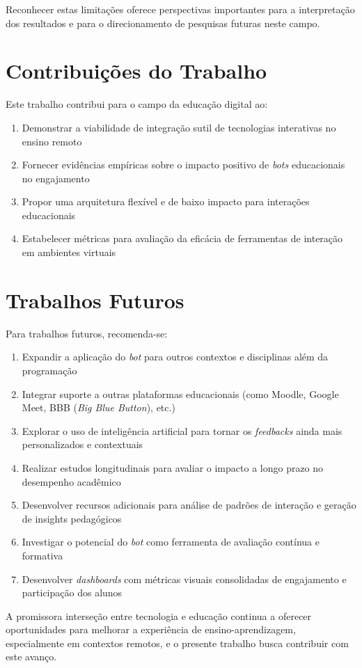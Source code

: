 Reconhecer estas limitações oferece perspectivas importantes para a
interpretação dos resultados e para o direcionamento de pesquisas futuras neste
campo.

\section{Contribuições do Trabalho}
\label{sec:contribuicoes}

Este trabalho contribui para o campo da educação digital ao:

\begin{enumerate}
\item Demonstrar a viabilidade de integração sutil de tecnologias interativas no
ensino remoto
\item Fornecer evidências empíricas sobre o impacto positivo de \textit{bots} 
educacionais no engajamento
\item Propor uma arquitetura flexível e de baixo impacto para interações
educacionais
\item Estabelecer métricas para avaliação da eficácia de ferramentas de
interação em ambientes virtuais
\end{enumerate}

\section{Trabalhos Futuros}
\label{sec:trabalhos-futuros}

Para trabalhos futuros, recomenda-se:

\begin{enumerate}
\item Expandir a aplicação do \textit{bot} para outros contextos e disciplinas
além da programação
\item Integrar suporte a outras plataformas educacionais (como Moodle, Google
Meet, BBB (\textit{Big Blue Button}), etc.)
\item Explorar o uso de inteligência artificial para tornar os
\textit{feedbacks} ainda mais personalizados e contextuais
\item Realizar estudos longitudinais para avaliar o impacto a longo prazo no
desempenho acadêmico
\item Desenvolver recursos adicionais para análise de padrões de interação e
geração de insights pedagógicos
\item Investigar o potencial do \textit{bot} como ferramenta de avaliação
contínua e formativa
\item Desenvolver \textit{dashboards} com métricas visuais consolidadas de
engajamento e participação dos alunos
\end{enumerate}

A promissora interseção entre tecnologia e educação continua a oferecer
oportunidades para melhorar a experiência de ensino-aprendizagem, especialmente
em contextos remotos, e o presente trabalho busca contribuir com este avanço.
